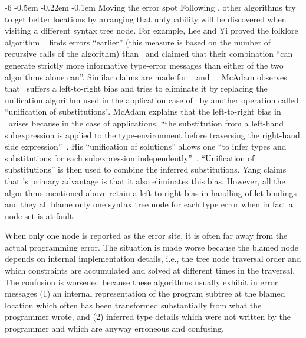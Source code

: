 \documentclass{jfp1}
\makeatletter
\def\subsubsection{\@startsection{subsubsection}{3}{\z@}{-0.2\baselineskip plus -0.1\baselineskip minus -0.1\baselineskip}%
    {-0.5em \@plus -0.22em \@minus -0.1em}{\normalfont\normalsize\bfseries}}%
\newcommand{\sectiontitledot}[1]{#1.}
\renewcommand\subsubsection{\@startsection{subsubsection}{3}{\z@}%
                            {-6\p@ \@plus -1\p@ \@minus -1\p@}%
                            {-0.5em \@plus -0.22em \@minus -0.1em}%
                            {\normalfont\normalsize\bfseries\boldmath\sectiontitledot}}
\makeatother
\begin{document}
\subsubsection{Moving the error spot}
%
Following \walgo, other algorithms
try
to get better locations by arranging that untypability will be
discovered when visiting a different syntax tree node.
%
For example, Lee and Yi proved the folklore algorithm
\malgo~\cite{Lee+Yi:1998} finds errors ``earlier'' (this measure is
based on the number of recursive calls of the algorithm) than
\walgo\ and claimed that their combination ``can generate strictly
more informative type-error messages than either of the two algorithms
alone can''.  Similar claims are made for
\walgop~\cite{McAdam:1999} and \uaealgo~\cite{Yang:2000}.  McAdam
observes that \walgo\ suffers a left-to-right bias and tries to
eliminate it by replacing the unification algorithm used in the
application case of \walgo\ by another operation called ``unification
of substitutions''.
%
McAdam explains that the left-to-right bias in \walgo\ arises because
in the case of applications, ``the substitution from a left-hand
subexpression is applied to the type-environment before traversing the
right-hand side expression''~\cite{McAdam:1999}.  His ``unification of
solutions'' allows one ``to infer types and substitutions for each
subexpression independently''~\cite{McAdam:1999}.  ``Unification
of substitutions'' is then used to combine the inferred
substitutions.
%
Yang claims that \uaealgo's primary advantage is that it also
eliminates this bias.
%
%
However, all the algorithms mentioned above retain a left-to-right bias in
handling of let-bindings and they all blame only one syntax tree node
for each type error when in fact a node set is at fault.

When only one node is reported as the error site, it is often far away
from the actual programming error.  The situation is made worse
because the blamed node depends on internal implementation details,
i.e., the tree node traversal order and which constraints are
accumulated and solved at different times in the traversal.  The
confusion is worsened because these algorithms usually exhibit in
error messages (1) an internal representation of the program subtree
at the blamed location which often has been transformed substantially
from what the programmer wrote, and (2) inferred type details which
were not written by the programmer and which are anyway erroneous and
confusing.
\end{document}
